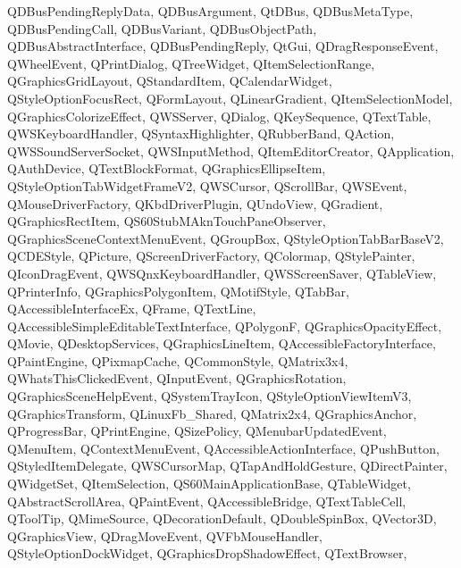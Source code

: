 {{    QDBusPendingReplyData,%
    QDBusArgument,%
    QtDBus,%
    QDBusMetaType,%
    QDBusPendingCall,%
    QDBusVariant,%
    QDBusObjectPath,%
    QDBusAbstractInterface,%
    QDBusPendingReply,%
    QtGui,%
    QDragResponseEvent,%
    QWheelEvent,%
    QPrintDialog,%
    QTreeWidget,%
    QItemSelectionRange,%
    QGraphicsGridLayout,%
    QStandardItem,%
    QCalendarWidget,%
    QStyleOptionFocusRect,%
    QFormLayout,%
    QLinearGradient,%
    QItemSelectionModel,%
    QGraphicsColorizeEffect,%
    QWSServer,%
    QDialog,%
    QKeySequence,%
    QTextTable,%
    QWSKeyboardHandler,%
    QSyntaxHighlighter,%
    QRubberBand,%
    QAction,%
    QWSSoundServerSocket,%
    QWSInputMethod,%
    QItemEditorCreator,%
    QApplication,%
    QAuthDevice,%
    QTextBlockFormat,%
    QGraphicsEllipseItem,%
    QStyleOptionTabWidgetFrameV2,%
    QWSCursor,%
    QScrollBar,%
    QWSEvent,%
    QMouseDriverFactory,%
    QKbdDriverPlugin,%
    QUndoView,%
    QGradient,%
    QGraphicsRectItem,%
    QS60StubMAknTouchPaneObserver,%
    QGraphicsSceneContextMenuEvent,%
    QGroupBox,%
    QStyleOptionTabBarBaseV2,%
    QCDEStyle,%
    QPicture,%
    QScreenDriverFactory,%
    QColormap,%
    QStylePainter,%
    QIconDragEvent,%
    QWSQnxKeyboardHandler,%
    QWSScreenSaver,%
    QTableView,%
    QPrinterInfo,%
    QGraphicsPolygonItem,%
    QMotifStyle,%
    QTabBar,%
    QAccessibleInterfaceEx,%
    QFrame,%
    QTextLine,%
    QAccessibleSimpleEditableTextInterface,%
    QPolygonF,%
    QGraphicsOpacityEffect,%
    QMovie,%
    QDesktopServices,%
    QGraphicsLineItem,%
    QAccessibleFactoryInterface,%
    QPaintEngine,%
    QPixmapCache,%
    QCommonStyle,%
    QMatrix3x4,%
    QWhatsThisClickedEvent,%
    QInputEvent,%
    QGraphicsRotation,%
    QGraphicsSceneHelpEvent,%
    QSystemTrayIcon,%
    QStyleOptionViewItemV3,%
    QGraphicsTransform,%
    QLinuxFb_Shared,%
    QMatrix2x4,%
    QGraphicsAnchor,%
    QProgressBar,%
    QPrintEngine,%
    QSizePolicy,%
    QMenubarUpdatedEvent,%
    QMenuItem,%
    QContextMenuEvent,%
    QAccessibleActionInterface,%
    QPushButton,%
    QStyledItemDelegate,%
    QWSCursorMap,%
    QTapAndHoldGesture,%
    QDirectPainter,%
    QWidgetSet,%
    QItemSelection,%
    QS60MainApplicationBase,%
    QTableWidget,%
    QAbstractScrollArea,%
    QPaintEvent,%
    QAccessibleBridge,%
    QTextTableCell,%
    QToolTip,%
    QMimeSource,%
    QDecorationDefault,%
    QDoubleSpinBox,%
    QVector3D,%
    QGraphicsView,%
    QDragMoveEvent,%
    QVFbMouseHandler,%
    QStyleOptionDockWidget,%
    QGraphicsDropShadowEffect,%
    QTextBrowser,%
}}
